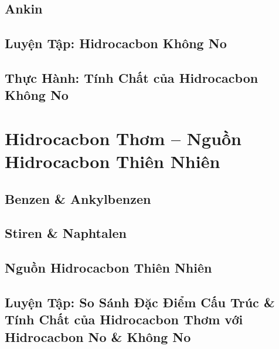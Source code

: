 \documentclass[oneside]{book}
\numberwithin{equation}{section}
\begin{document}

\section{Ankin}


\section{Luyện Tập: Hidrocacbon Không No}


\section{Thực Hành: Tính Chất của Hidrocacbon Không No}


\chapter{Hidrocacbon Thơm -- Nguồn Hidrocacbon Thiên Nhiên}

\section{Benzen \& Ankylbenzen}


\section{Stiren \& Naphtalen}


\section{Nguồn Hidrocacbon Thiên Nhiên}


\section{Luyện Tập: So Sánh Đặc Điểm Cấu Trúc \& Tính Chất của Hidrocacbon Thơm với Hidrocacbon No \& Không No}
\end{document}
